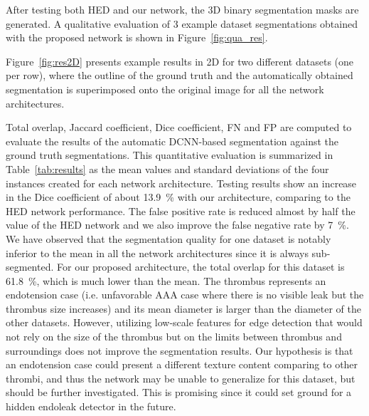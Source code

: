 \documentclass[preprint,authoryear,12pt]{elsarticle}
\begin{document}
After testing both HED and our network, the 3D binary segmentation masks are generated. A qualitative evaluation of 3 example dataset segmentations obtained with the proposed network is shown in Figure~\ref{fig:qua_res}.%

Figure~\ref{fig:res2D} presents example results in 2D for two different datasets (one per row), where the outline of the ground truth and the automatically obtained segmentation is superimposed onto the original image for all the network architectures.  \par

Total overlap, Jaccard coefficient, Dice coefficient, FN and FP are computed to evaluate the results of the automatic DCNN-based segmentation against the ground truth segmentations. This quantitative evaluation is summarized in Table~\ref{tab:results} as the mean values and standard deviations of the four instances created for each network architecture. Testing results show an increase in the Dice coefficient of about 13.9~\% with our architecture, comparing to the HED network performance. The false positive rate is reduced almost by half the value of the HED network and we also improve the false negative rate by 7~\%. We have observed that the segmentation quality for one dataset is notably inferior to the mean in all the network architectures since it is always sub-segmented. For our proposed architecture, the total overlap for this dataset is 61.8~\%, which is much lower than the mean. The thrombus represents an endotension case (i.e. unfavorable AAA case where there is no visible leak but the thrombus size increases) and its mean diameter is larger than the diameter of the other datasets. However, utilizing low-scale features for edge detection that would not rely on the size of the thrombus but on the limits between thrombus and surroundings does not improve the segmentation results. Our hypothesis is that an endotension case could present a different texture content comparing to other thrombi, and thus the network may be unable to generalize for this dataset, but should be further investigated. This is promising since it could set ground for a hidden endoleak detector in the future.
\end{document}
